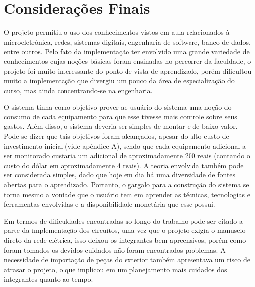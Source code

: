 \chapter{Considerações Finais}
\label{Cap:consideracoes_finais}

O projeto permitiu o uso dos conhecimentos vistos em aula relacionados à microeletrônica, redes, sistemas digitais, engenharia de software, banco de dados, entre outros. Pelo fato da implementação ter envolvido uma grande variedade de conhecimentos cujas noções básicas foram ensinadas no percorrer da faculdade, o projeto foi muito interessante do ponto de vista de aprendizado, porém dificultou muito a implementação que divergiu um pouco da área de especialização do curso, mas ainda concentrando-se na engenharia.

O sistema tinha como objetivo prover ao usuário do sistema uma noção do consumo de cada equipamento para que esse tivesse mais controle sobre seus gastos. Além disso, o sistema deveria ser simples de montar e de baixo valor. Pode se dizer que tais objetivos foram alcançados, apesar do alto custo de investimento inicial (vide apêndice A), sendo que cada equipamento adicional a ser monitorado custaria um adicional de aproximadamente 200 reais (contando o custo do dólar em aproximadamente 4 reais). A teoria envolvida também pode ser considerada simples, dado que hoje em dia há uma diversidade de fontes abertas para o aprendizado. Portanto, o gargalo para a construção do sistema se torna mesmo a vontade que o usuário tem em aprender as técnicas, tecnologias e ferramentas envolvidas e a disponibilidade monetária que esse possui.

Em termos de dificuldades encontradas ao longo do trabalho pode ser citado a parte da implementação dos circuitos, uma vez que o projeto exigia o manuseio direto da rede elétrica, isso deixou os integrantes bem apreensivos, porém como foram tomados os devidos cuidados não foram encontrados problemas. A necessidade de importação de peças do exterior também apresentava um risco de atrasar o projeto, o que implicou em um planejamento mais cuidados dos integrantes quanto ao tempo.